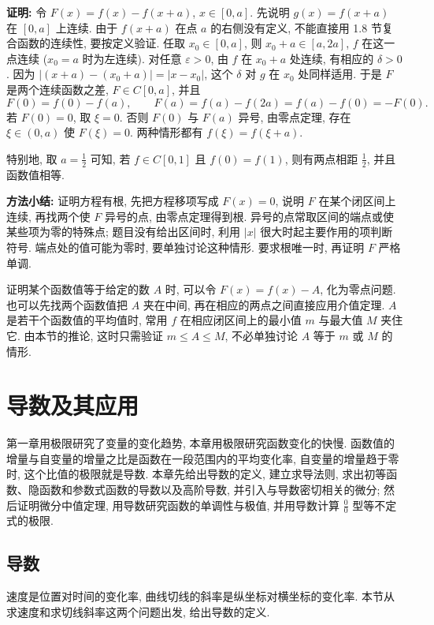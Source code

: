 \documentclass[UTF8,openany]{ctexbook}
\theoremstyle{chinesetextbook}
\newenvironment{cnproof}{\par\indent\textbf{证明:} \ignorespaces}{\par}
\begin{document}
\begin{cnproof}
令 $F(x)=f(x)-f(x+a)$, $x\in[0,a]$. 先说明 $g(x)=f(x+a)$ 在 $[0,a]$ 上连续. 由于 $f(x+a)$ 在点 $a$ 的右侧没有定义, 不能直接用 1.8 节复合函数的连续性, 要按定义验证. 任取 $x_0\in[0,a]$, 则 $x_0+a\in[a,2a]$, $f$ 在这一点连续 ($x_0=a$ 时为左连续). 对任意 $\varepsilon>0$, 由 $f$ 在 $x_0+a$ 处连续, 有相应的 $\delta>0$. 因为 $|(x+a)-(x_0+a)|=|x-x_0|$, 这个 $\delta$ 对 $g$ 在 $x_0$ 处同样适用. 于是 $F$ 是两个连续函数之差, $F\in C[0,a]$, 并且
\[
F(0)=f(0)-f(a),\qquad F(a)=f(a)-f(2a)=f(a)-f(0)=-F(0).
\]
若 $F(0)=0$, 取 $\xi=0$. 否则 $F(0)$ 与 $F(a)$ 异号, 由零点定理, 存在 $\xi\in(0,a)$ 使 $F(\xi)=0$. 两种情形都有 $f(\xi)=f(\xi+a)$.
\end{cnproof}
特别地, 取 $\displaystyle a=\frac12$ 可知, 若 $f\in C[0,1]$ 且 $f(0)=f(1)$, 则有两点相距 $\displaystyle\frac12$, 并且函数值相等.

\par\indent\textbf{方法小结:} 证明方程有根, 先把方程移项写成 $F(x)=0$, 说明 $F$ 在某个闭区间上连续, 再找两个使 $F$ 异号的点, 由零点定理得到根. 异号的点常取区间的端点或使某些项为零的特殊点; 题目没有给出区间时, 利用 $|x|$ 很大时起主要作用的项判断符号. 端点处的值可能为零时, 要单独讨论这种情形. 要求根唯一时, 再证明 $F$ 严格单调.

证明某个函数值等于给定的数 $A$ 时, 可以令 $F(x)=f(x)-A$, 化为零点问题. 也可以先找两个函数值把 $A$ 夹在中间, 再在相应的两点之间直接应用介值定理. $A$ 是若干个函数值的平均值时, 常用 $f$ 在相应闭区间上的最小值 $m$ 与最大值 $M$ 夹住它. 由本节的推论, 这时只需验证 $m\le A\le M$, 不必单独讨论 $A$ 等于 $m$ 或 $M$ 的情形.
\chapter{导数及其应用}
第一章用极限研究了变量的变化趋势, 本章用极限研究函数变化的快慢. 函数值的增量与自变量的增量之比是函数在一段范围内的平均变化率, 自变量的增量趋于零时, 这个比值的极限就是导数. 本章先给出导数的定义, 建立求导法则, 求出初等函数、隐函数和参数式函数的导数以及高阶导数, 并引入与导数密切相关的微分; 然后证明微分中值定理, 用导数研究函数的单调性与极值, 并用导数计算 $\displaystyle\frac00$ 型等不定式的极限.
\section{导数}
速度是位置对时间的变化率, 曲线切线的斜率是纵坐标对横坐标的变化率. 本节从求速度和求切线斜率这两个问题出发, 给出导数的定义.
\end{document}
